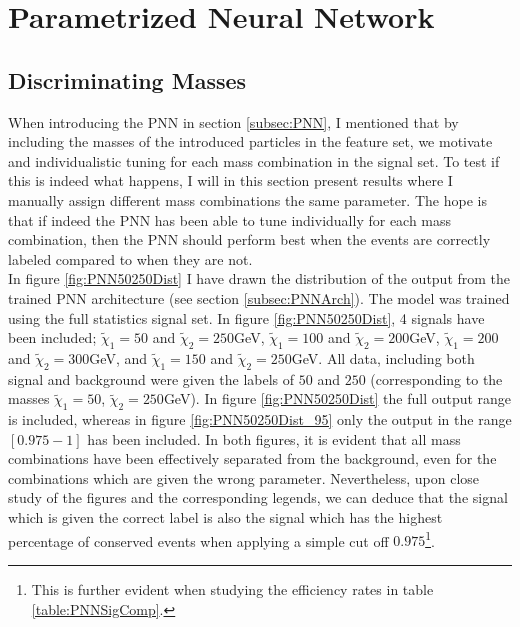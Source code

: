 \section{Parametrized Neural Network}
\subsection{Discriminating Masses}
When introducing the \ac{PNN} in section \ref{subsec:PNN}, I mentioned that by including the masses of the introduced particles
in the feature set, we motivate and individualistic tuning for each mass combination in the signal set. To test if this is indeed what 
happens, I will in this section present results where I manually assign different mass combinations the same parameter. The hope 
is that if indeed the \ac{PNN} has been able to tune individually for each mass combination, then the \ac{PNN} should perform best 
when the events are correctly labeled compared to when they are not. 
\\
In figure \ref{fig:PNN50250Dist} I have drawn the distribution of the output from the trained \ac{PNN} architecture 
(see section \ref{subsec:PNNArch}). The model was trained using the full statistics signal set. In figure \ref{fig:PNN50250Dist},
4 signals have been included; $\tilde{\chi}_1=50$ and $\tilde{\chi}_2=250$GeV, $\tilde{\chi}_1=100$ and $\tilde{\chi}_2=200$GeV, 
$\tilde{\chi}_1=200$ and $\tilde{\chi}_2=300$GeV, and $\tilde{\chi}_1=150$ and $\tilde{\chi}_2=250$GeV. All data, including 
both signal and background were given the labels of $50$ and $250$ (corresponding to the masses $\tilde{\chi}_1=50$, $\tilde{\chi}_2=250$GeV). 
In figure \ref{fig:PNN50250Dist} the full output range is included, whereas in figure \ref{fig:PNN50250Dist_95} only the output in the 
range $[0.975-1]$ has been included. In both figures, it is evident that all mass combinations have been effectively separated from the background,
even for the combinations which are given the wrong parameter. Nevertheless, upon close study of the figures and the corresponding legends, we can deduce that
the signal which is given the correct label is also the signal which has the highest percentage of conserved events when applying a simple cut off 
$0.975$\footnote{This is further evident when studying the efficiency rates in table \ref{table:PNNSigComp}.}.\\
